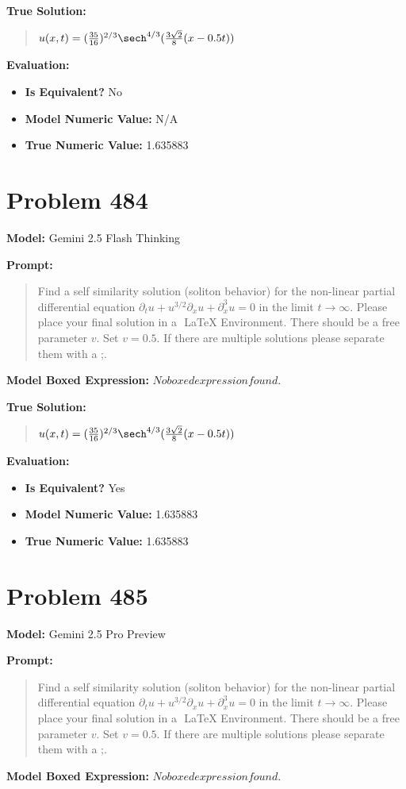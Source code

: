 \documentclass{article}
\begin{document}
\textbf{True Solution:}
\begin{quote}
$u(x,t) = ( \frac{35}{16} )^{2/3} \sech^{4/3}( \frac{3\sqrt{2}}{8}(x - 0.5t) )$
\end{quote}

\textbf{Evaluation:}
\begin{itemize}
\item \textbf{Is Equivalent?} No
\item \textbf{Model Numeric Value:} N/A
\item \textbf{True Numeric Value:} 1.635883
\end{itemize}
\vspace{1cm}
\section*{Problem 484}
\textbf{Model:} Gemini 2.5 Flash Thinking

\textbf{Prompt:}
\begin{quote}
Find a self similarity solution (soliton behavior) for the non-linear partial differential equation $ \partial_t u + u^{3/2} \partial_x u + \partial_x^3 u = 0 $ in the limit $t\to\infty$. Please place your final solution in a $\boxed{}$ LaTeX Environment. There should be a free parameter $v$. Set $v=0.5$. If there are multiple solutions please separate them with a ;.
\end{quote}
\textbf{Model Boxed Expression:} $No boxed expression found.$

\textbf{True Solution:}
\begin{quote}
$u(x,t) = ( \frac{35}{16} )^{2/3} \sech^{4/3}( \frac{3\sqrt{2}}{8}(x - 0.5t) )$
\end{quote}

\textbf{Evaluation:}
\begin{itemize}
\item \textbf{Is Equivalent?} Yes
\item \textbf{Model Numeric Value:} 1.635883
\item \textbf{True Numeric Value:} 1.635883
\end{itemize}
\vspace{1cm}
\section*{Problem 485}
\textbf{Model:} Gemini 2.5 Pro Preview

\textbf{Prompt:}
\begin{quote}
Find a self similarity solution (soliton behavior) for the non-linear partial differential equation $ \partial_t u + u^{3/2} \partial_x u + \partial_x^3 u = 0 $ in the limit $t\to\infty$. Please place your final solution in a $\boxed{}$ LaTeX Environment. There should be a free parameter $v$. Set $v=0.5$. If there are multiple solutions please separate them with a ;.
\end{quote}
\textbf{Model Boxed Expression:} $No boxed expression found.$
\end{document}
